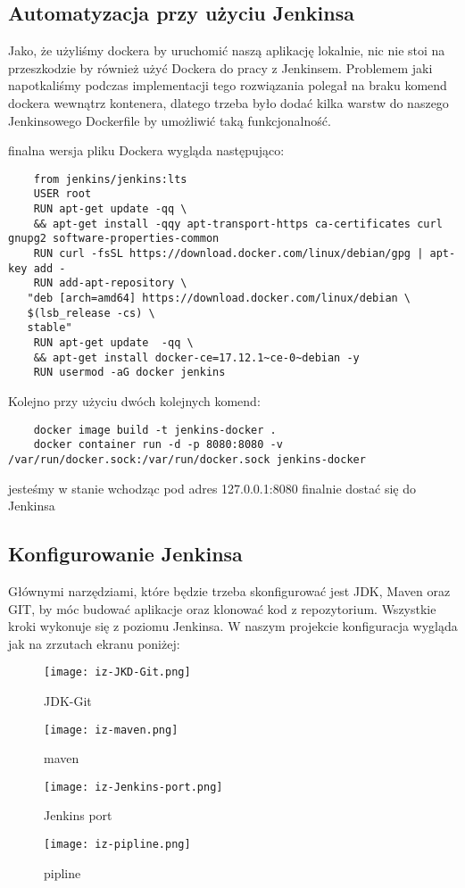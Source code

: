 \subsection{Automatyzacja przy użyciu Jenkinsa}

Jako, że użyliśmy dockera by uruchomić naszą aplikację lokalnie, nic nie stoi na przeszkodzie by również użyć Dockera do pracy z Jenkinsem. Problemem jaki napotkaliśmy podczas implementacji tego rozwiązania polegał na braku komend dockera wewnątrz kontenera, dlatego trzeba było dodać kilka warstw do naszego Jenkinsowego Dockerfile by umożliwić taką funkcjonalność. 

finalna wersja pliku Dockera wygląda następująco: 

\begin{lstlisting}
    from jenkins/jenkins:lts
    USER root
    RUN apt-get update -qq \
    && apt-get install -qqy apt-transport-https ca-certificates curl gnupg2 software-properties-common
    RUN curl -fsSL https://download.docker.com/linux/debian/gpg | apt-key add -
    RUN add-apt-repository \
   "deb [arch=amd64] https://download.docker.com/linux/debian \
   $(lsb_release -cs) \
   stable"
    RUN apt-get update  -qq \
    && apt-get install docker-ce=17.12.1~ce-0~debian -y
    RUN usermod -aG docker jenkins
\end{lstlisting}

Kolejno przy użyciu dwóch kolejnych komend:
\begin{lstlisting}
    docker image build -t jenkins-docker .
    docker container run -d -p 8080:8080 -v /var/run/docker.sock:/var/run/docker.sock jenkins-docker
\end{lstlisting}

jesteśmy w stanie wchodząc pod adres 127.0.0.1:8080 finalnie dostać się do Jenkinsa

\subsection{Konfigurowanie Jenkinsa}

Głównymi narzędziami, które będzie trzeba skonfigurować jest JDK, Maven oraz GIT, by móc budować aplikacje oraz klonować kod z repozytorium. Wszystkie kroki wykonuje się z poziomu Jenkinsa. W naszym projekcie konfiguracja wygląda jak na zrzutach ekranu poniżej:

\begin{figure}[htbp]
    \centering
    \texttt{[image: iz-JKD-Git.png]}
    \caption{JDK-Git}
    \label{fig:JDK-Git}
\end{figure}
\begin{figure}[htbp]
    \centering
    \texttt{[image: iz-maven.png]}
    \caption{maven}
    \label{fig:maven}
\end{figure}
\begin{figure}[htbp]
    \centering
    \texttt{[image: iz-Jenkins-port.png]}
    \caption{Jenkins port}
    \label{fig:Jenkins-port}
\end{figure}
\begin{figure}[htbp]
    \centering
    \texttt{[image: iz-pipline.png]}
    \caption{pipline}
    \label{fig:pipeline}
\end{figure}



